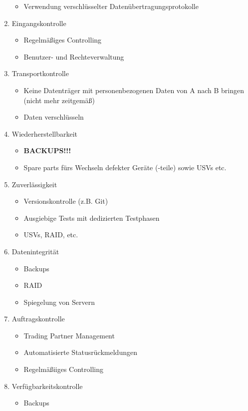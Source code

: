 \documentclass[a4paper, 12pt]{report}
\begin{document}
\begin{multicols}{2}
\begin{enumerate}
\begin{itemize}
			\item Verwendung verschlüsselter 
				Datenübertragungsprotokolle
		\end{itemize}
	\item Eingangskontrolle
		\begin{itemize}
			\item Regelmäßiges Controlling
			\item Benutzer- und Rechteverwaltung
		\end{itemize}
	\item Transportkontrolle
		\begin{itemize}
			\item Keine Datenträger mit personenbezogenen Daten von 
				A nach B bringen (nicht mehr zeitgemäß)
			\item Daten verschlüsseln
		\end{itemize}
	\item Wiederherstellbarkeit
		\begin{itemize}
			\item \textbf{BACKUPS!!!}
			\item Spare parts fürs Wechseln defekter Geräte (-teile)
				sowie USVs etc.
		\end{itemize}
	\item Zuverlässigkeit
		\begin{itemize}
			\item Versionskontrolle (z.B. Git)
			\item Ausgiebige Tests mit dedizierten Testphasen
			\item USVs, RAID, etc. 
		\end{itemize}
	\item Datenintegrität
		\begin{itemize}
			\item Backups 
			\item RAID
			\item Spiegelung von Servern
		\end{itemize}
	\item Auftragskontrolle
		\begin{itemize}
			\item Trading Partner Management
			\item Automatisierte Statusrückmeldungen
			\item Regelmäßiiges Controlling
		\end{itemize}
	\item Verfügbarkeitskontrolle
		\begin{itemize}
			\item Backups

\end{itemize}
\end{enumerate}
\end{multicols}
\end{document}
